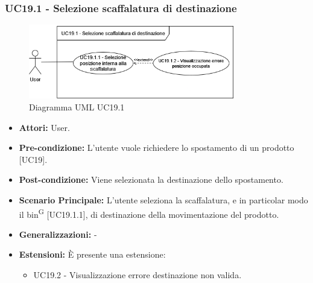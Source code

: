 \subsubsection{UC19.1 - Selezione scaffalatura di destinazione}
\begin{figure}[H]
  \centering
  \includegraphics[width=0.8\textwidth]{UC_diagrams_11-20/UC19.1.drawio.png}
   \caption{Diagramma UML UC19.1}
\end{figure}
\begin{itemize}
    \item \textbf{Attori:} User.
    \item \textbf{Pre-condizione:} L'utente vuole richiedere lo spostamento di un prodotto [UC19].
    \item \textbf{Post-condizione:} Viene selezionata la destinazione dello spostamento.
    \item \textbf{Scenario Principale:} L'utente seleziona la scaffalatura, e in particolar modo il bin\textsuperscript{G} [UC19.1.1], di destinazione della movimentazione del prodotto.
    \item \textbf{Generalizzazioni:} -
    \item \textbf{Estensioni:} È presente una estensione:
    \begin{itemize}
        \item UC19.2 - Visualizzazione errore destinazione non valida.
    \end{itemize}
\end{itemize}


